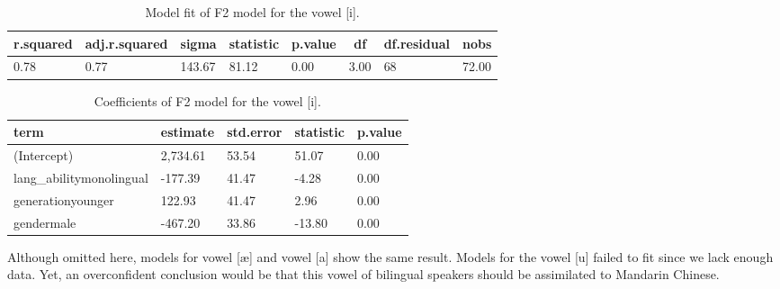 \documentclass[
  man,floatsintext]{apa6}
\begin{document}
\begin{table}[H]

\begin{center}
\begin{threeparttable}

\caption{\label{tab:table5&6}Model fit of F2 model for the vowel [i].}

\begin{tabular}{llllllll}
\toprule
r.squared & \multicolumn{1}{c}{adj.r.squared} & \multicolumn{1}{c}{sigma} & \multicolumn{1}{c}{statistic} & \multicolumn{1}{c}{p.value} & \multicolumn{1}{c}{df} & \multicolumn{1}{c}{df.residual} & \multicolumn{1}{c}{nobs}\\
\midrule
0.78 & 0.77 & 143.67 & 81.12 & 0.00 & 3.00 & 68 & 72.00\\
\bottomrule
\end{tabular}

\end{threeparttable}
\end{center}

\end{table}

\begin{table}[H]

\begin{center}
\begin{threeparttable}

\caption{\label{tab:table5&6}Coefficients of F2 model for the vowel [i].}

\begin{tabular}{lllll}
\toprule
term & \multicolumn{1}{c}{estimate} & \multicolumn{1}{c}{std.error} & \multicolumn{1}{c}{statistic} & \multicolumn{1}{c}{p.value}\\
\midrule
(Intercept) & 2,734.61 & 53.54 & 51.07 & 0.00\\
lang\_abilitymonolingual & -177.39 & 41.47 & -4.28 & 0.00\\
generationyounger & 122.93 & 41.47 & 2.96 & 0.00\\
gendermale & -467.20 & 33.86 & -13.80 & 0.00\\
\bottomrule
\end{tabular}

\end{threeparttable}
\end{center}

\end{table}

Although omitted here, models for vowel {[}æ{]} and vowel {[}a{]} show the same result. Models for the vowel {[}u{]} failed to fit since we lack enough data. Yet, an overconfident conclusion would be that this vowel of bilingual speakers should be assimilated to Mandarin Chinese.
\end{document}
